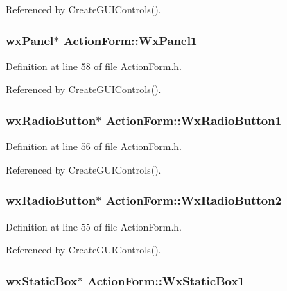 Referenced by Create\-GUIControls().
\subsubsection{\setlength{\rightskip}{0pt plus 5cm}wx\-Panel$\ast$ {\bf Action\-Form::Wx\-Panel1}\hspace{0.3cm}{\tt  [private]}}\label{class_action_form_e915ae33ce971424d9a90bed50473ffc}




Definition at line 58 of file Action\-Form.h.

Referenced by Create\-GUIControls().
\subsubsection{\setlength{\rightskip}{0pt plus 5cm}wx\-Radio\-Button$\ast$ {\bf Action\-Form::Wx\-Radio\-Button1}\hspace{0.3cm}{\tt  [private]}}\label{class_action_form_47e98c52492c6d66557fd04eeb9c8a7d}




Definition at line 56 of file Action\-Form.h.

Referenced by Create\-GUIControls().
\subsubsection{\setlength{\rightskip}{0pt plus 5cm}wx\-Radio\-Button$\ast$ {\bf Action\-Form::Wx\-Radio\-Button2}\hspace{0.3cm}{\tt  [private]}}\label{class_action_form_06d767e2b98d8146c7df574803d50313}




Definition at line 55 of file Action\-Form.h.

Referenced by Create\-GUIControls().
\subsubsection{\setlength{\rightskip}{0pt plus 5cm}wx\-Static\-Box$\ast$ {\bf Action\-Form::Wx\-Static\-Box1}\hspace{0.3cm}{\tt  [private]}}\label{class_action_form_5f9cddcd24f9822e918d982035d20652}




